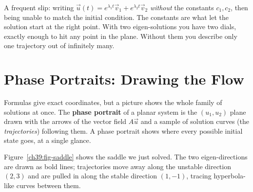 \begin{trapbox}
A frequent slip: writing
$\vec u(t) = e^{\lambda_1 t}\vec v_1 + e^{\lambda_2 t}\vec v_2$ \emph{without} the
constants $c_1, c_2$, then being unable to match the initial condition. The
constants are what let the
solution start at the right point. With two eigen-solutions you have two
dials, exactly enough to hit any point in the plane. Without them you
describe only one trajectory out of infinitely many.
\end{trapbox}

\section{Phase Portraits: Drawing the Flow}
\label{ch39:phase}

Formulas give exact coordinates, but a picture shows the whole family of
solutions at once. The \textbf{phase
portrait} of a planar system is the $(u_1, u_2)$ plane drawn with the
arrows of the vector field $A\vec u$ and a sample of solution
curves (the \emph{trajectories}) following them. A phase
portrait shows where every possible initial state goes, at a single
glance.

Figure~\ref{ch39:fig-saddle} shows the saddle we just solved. The two eigen-directions are drawn as bold
lines; trajectories move away along the unstable direction $(2,3)$ and are
pulled in along the stable direction $(1,-1)$, tracing hyperbola-like
curves between them.

